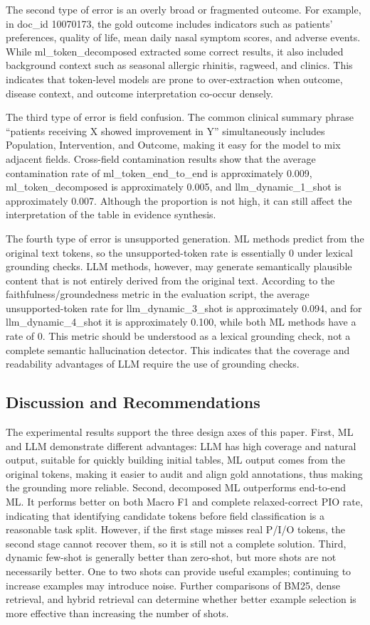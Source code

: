 \documentclass{article}
\begin{document}
The second type of error is an overly broad or fragmented outcome. For example, in doc\_id 10070173, the gold outcome includes indicators such as patients’ preferences, quality of life, mean daily nasal symptom scores, and adverse events. While ml\_token\_decomposed extracted some correct results, it also included background context such as seasonal allergic rhinitis, ragweed, and clinics. This indicates that token-level models are prone to over-extraction when outcome, disease context, and outcome interpretation co-occur densely.


The third type of error is field confusion. The common clinical summary phrase “patients receiving X showed improvement in Y” simultaneously includes Population, Intervention, and Outcome, making it easy for the model to mix adjacent fields. Cross-field contamination results show that the average contamination rate of ml\_token\_end\_to\_end is approximately 0.009, ml\_token\_decomposed is approximately 0.005, and llm\_dynamic\_1\_shot is approximately 0.007. Although the proportion is not high, it can still affect the interpretation of the table in evidence synthesis.


The fourth type of error is unsupported generation. ML methods predict from the original text tokens, so the unsupported-token rate is essentially 0 under lexical grounding checks. LLM methods, however, may generate semantically plausible content that is not entirely derived from the original text. According to the faithfulness/groundedness metric in the evaluation script, the average unsupported-token rate for llm\_dynamic\_3\_shot is approximately 0.094, and for llm\_dynamic\_4\_shot it is approximately 0.100, while both ML methods have a rate of 0. This metric should be understood as a lexical grounding check, not a complete semantic hallucination detector. This indicates that the coverage and readability advantages of LLM require the use of grounding checks.

\subsection{Discussion and Recommendations}
The experimental results support the three design axes of this paper. First, ML and LLM demonstrate different advantages: LLM has high coverage and natural output, suitable for quickly building initial tables, ML output comes from the original tokens, making it easier to audit and align gold annotations, thus making the grounding more reliable. Second, decomposed ML outperforms end-to-end ML. It performs better on both Macro F1 and complete relaxed-correct PIO rate, indicating that identifying candidate tokens before field classification is a reasonable task split. However, if the first stage misses real P/I/O tokens, the second stage cannot recover them, so it is still not a complete solution. Third, dynamic few-shot is generally better than zero-shot, but more shots are not necessarily better. One to two shots can provide useful examples; continuing to increase examples may introduce noise. Further comparisons of BM25, dense retrieval, and hybrid retrieval can determine whether better example selection is more effective than increasing the number of shots.
\end{document}

